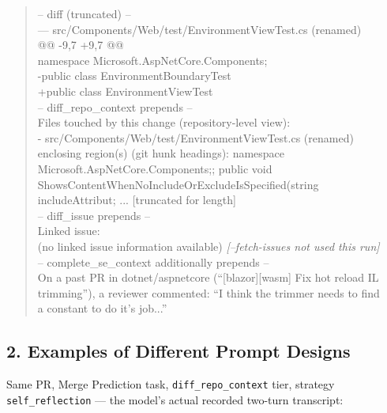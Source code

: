 \documentclass{experimentreport}
\begin{document}
{\begin{quote}
\ttfamily\footnotesize\noindent
-- diff (truncated) --\\
--- src/Components/Web/test/EnvironmentViewTest.cs (renamed)\\
@@ -9,7 +9,7 @@\\
\hspace*{0.5em} namespace Microsoft.AspNetCore.Components;\\
-public class EnvironmentBoundaryTest\\
+public class EnvironmentViewTest\\[0.4em]
-- diff\_repo\_context prepends --\\
Files touched by this change (repository-level view):\\
\hspace*{1.0em}  - src/Components/Web/test/EnvironmentViewTest.cs (renamed)\\
\hspace*{2.0em}    enclosing region(s) (git hunk headings): namespace\\
\hspace*{2.0em}    Microsoft.AspNetCore.Components;; public void\\
\hspace*{2.0em}    ShowsContentWhenNoIncludeOrExcludeIsSpecified(string\\
\hspace*{2.0em}    includeAttribut; ... [truncated for length]\\[0.4em]
-- diff\_issue prepends --\\
Linked issue:\\
(no linked issue information available) \emph{[--fetch-issues not used this run]}\\[0.4em]
-- complete\_se\_context additionally prepends --\\
On a past PR in dotnet/aspnetcore (``[blazor][wasm] Fix hot reload IL\\
trimming''), a reviewer commented: ``I think the trimmer needs to find\\
a constant to do it's job...''
\end{quote}

\subsection*{2. Examples of Different Prompt Designs}

Same PR, Merge Prediction task, \texttt{diff\_repo\_context} tier, strategy \texttt{self\_reflection}
--- the model's actual recorded two-turn transcript:

}
\end{document}
